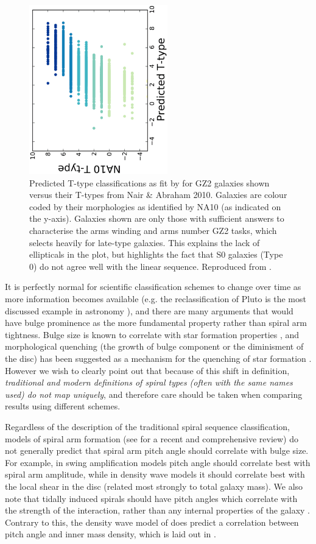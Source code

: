 \documentclass[usenatbib]{mn2e}
\begin{document}
\begin{figure}
\includegraphics[width=60mm,angle=-90]{Figure8.ps}
\caption{Predicted T-type classifications as fit by \citet{Willett2013} for GZ2 galaxies shown versus their T-types from Nair \& Abraham 2010. Galaxies are colour coded by their morphologies as identified by NA10 (as indicated on the y-axis). Galaxies shown are only those with sufficient answers to characterise the arms winding and arms number GZ2 tasks, which selects heavily for late-type galaxies. This explains the lack of ellipticals in the plot, but highlights the fact that S0 galaxies (Type 0) do not agree well with the linear sequence. Reproduced from \citet{Willett2013}.  \label{T-type}}
\end{figure}


It is perfectly normal for scientific classification schemes to change over time as more information becomes available (e.g. the reclassification of Pluto is the most discussed example in astronomy \citep{Messeri}), and there are many arguments that would have bulge prominence as the more fundamental property rather than spiral arm tightness. Bulge size is known to correlate with star formation properties \citep[e.g.][]{Cheung2012,Fang2013}, and morphological quenching (the growth of bulge component or the diminisment of the disc) has been suggested as a mechanism for the quenching of star formation \citep{Martig2009}. However we wish to clearly point out that because of this shift in definition, {\it traditional and modern definitions of spiral types (often with the same names used) do not map uniquely}, and therefore care should be taken when comparing results using different schemes.  

 Regardless of the description of the traditional spiral sequence classification, models of spiral arm formation (see \citealt{DobbsBaba2014} for a recent and comprehensive review) do not generally predict that spiral arm pitch angle should correlate with bulge size. For example, in swing amplification models pitch angle should correlate best with spiral arm amplitude, while in density wave models it should correlate best with the local shear in the disc (related most strongly to total galaxy mass). We also note that tidally induced spirals should have pitch angles which correlate with the strength of the interaction, rather than any internal properties of the galaxy \citep{Kendall2011}. 
Contrary to this, the density wave model of \citet{LinShu1964} does predict a correlation between pitch angle and inner mass density, which is laid out in \citet{Davis2015}. 
 
\end{document}
